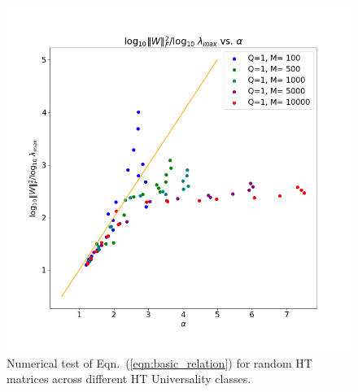 {\begin{figure}[!htb]
   \centering
   \includegraphics[scale=0.30]{img/Alpha-LogNorm-Relations.png}
   \caption{
            Numerical test of Eqn.~(\ref{eqn:basic_relation}) for random HT matrices across different HT Universality classes.
           }
   \label{fig:randW}
\end{figure}








}
